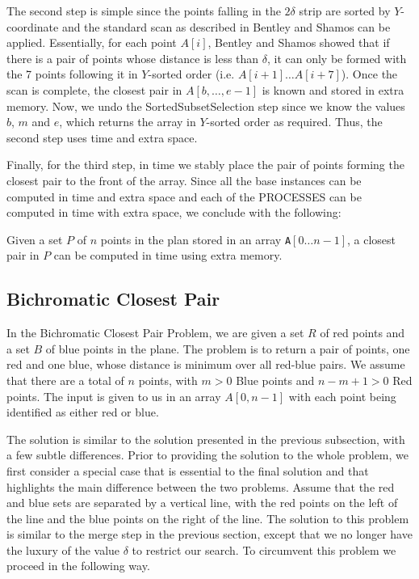 The second step is simple since the points falling in the $2\delta$ strip are sorted by $Y$-coordinate and the standard scan as described in 
Bentley and Shamos can be applied. Essentially, for each point $A[i]$, Bentley and Shamos showed that if there is a pair of points
whose distance is less than $\delta$, it can only be formed with the 7 points following it in $Y$-sorted order (i.e. $A[i+1] \ldots A[i+7]$).
Once the scan is complete, the closest pair in $A[b,\ldots,e-1]$ is known and stored in extra memory.
Now, we undo the SortedSubsetSelection step since we know the values $b$, $m$ and $e$, which returns the array
in $Y$-sorted order as required. Thus, the second step uses  time and  extra space.

Finally, for the third step, in  time we stably place the pair of points forming the closest pair to the front of the array.
Since all the base instances can be computed in  time and  extra space and each of the PROCESSES can be computed in
 time with  extra space, we conclude with the following:


\begin{theorem}
  Given a set $P$ of $n$ points in the plan stored in an array
  \texttt{A}$[0 \ldots n-1]$, a closest pair in $P$ can be computed in
   time using  extra memory.
\end{theorem}


\subsection{Bichromatic Closest Pair}

In the Bichromatic Closest Pair Problem, we are given a set $R$ of red
points and a set $B$ of blue points in the plane. The problem is to
return a pair of points, one red and one blue, whose distance is
minimum over all red-blue pairs. We assume that there are a total of $n$ points, with $m>0$ Blue points and $n-m+1>0$ Red points.
The input is given to us in an array $A[0,n-1]$ with each point being identified as either red or blue.

The solution is similar to the solution presented in the previous subsection, with a few subtle differences.
Prior to providing the solution to the whole problem, we first consider a special case  that is essential to 
the final solution and that highlights the main difference between the two problems. Assume that the red and blue sets are
separated by a vertical line, with the red points on the left of the line
and the blue points on the right of the line. The solution to this problem is similar to
the merge step in the previous section, except that we no longer have
the luxury of the value $\delta$ to restrict our search. To circumvent this problem we
proceed in the following way. 

